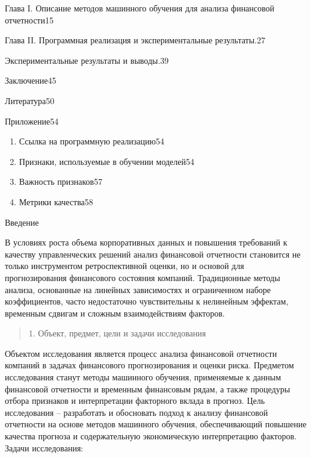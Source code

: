 \documentclass[
]{article}
\begin{document}
Глава I. Описание методов машинного обучения для анализа финансовой отчетности15

Глава II. Программная реализация и экспериментальные результаты.27

Экспериментальные результаты и выводы.39

Заключение45

Литература50

Приложение54

\begin{enumerate}
\def\labelenumi{\arabic{enumi}.}
\item
  Ссылка на программную реализацию54
\item
  Признаки, используемые в обучении моделей54
\item
  Важность признаков57
\item
  Метрики качества58
\end{enumerate}

Введение

В условиях роста объема корпоративных данных и повышения требований к качеству управленческих решений анализ финансовой отчетности становится не только инструментом ретроспективной оценки, но и основой для прогнозирования финансового состояния компаний. Традиционные методы анализа, основанные на линейных зависимостях и ограниченном наборе коэффициентов, часто недостаточно чувствительны к нелинейным эффектам, временным сдвигам и сложным взаимодействиям факторов.

\begin{quote}
1. Объект, предмет, цели и задачи исследования
\end{quote}

Объектом исследования является процесс анализа финансовой отчетности компаний в задачах финансового прогнозирования и оценки риска. Предметом исследования станут методы машинного обучения, применяемые к данным финансовой отчетности и временным финансовым рядам, а также процедуры отбора признаков и интерпретации факторного вклада в прогноз. Цель исследования -- разработать и обосновать подход к анализу финансовой отчетности на основе методов машинного обучения, обеспечивающий повышение качества прогноза и содержательную экономическую интерпретацию факторов. Задачи исследования:
\end{document}
